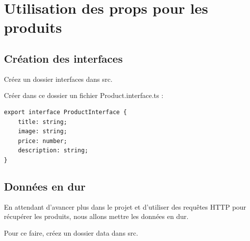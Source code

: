 \documentclass{article}
\begin{document}
\section{Utilisation des props pour les produits}
\subsection{Création des interfaces}
Créez un dossier interfaces dans src.

Créer dans ce dossier un fichier Product.interface.ts :
\begin{verbatim}
export interface ProductInterface {
    title: string;
    image: string;
    price: number;
    description: string;
}
\end{verbatim}
\subsection{Données en dur}
En attendant d'avancer plus dans le projet et d'utiliser des requêtes HTTP pour récupérer les produits, nous allons mettre les données en dur.

Pour ce faire, créez un dossier data dans src.
\end{document}
